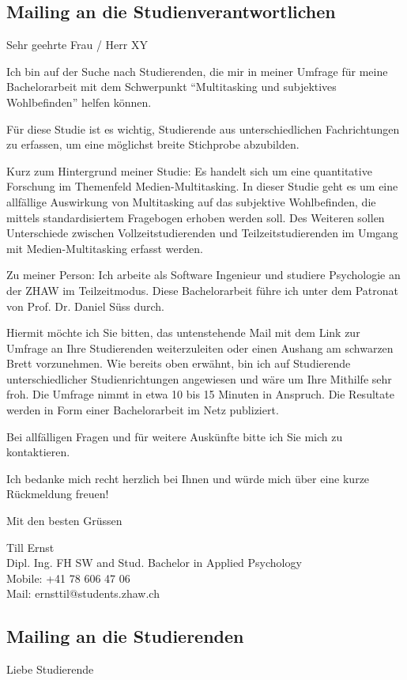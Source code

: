 \begin{RaggedRight}
\subsection{Mailing an die Studienverantwortlichen}\label{subsection.mailingVerantwortliche}
Sehr geehrte Frau / Herr XY

Ich bin auf der Suche nach Studierenden, die mir in meiner Umfrage für meine Bachelorarbeit mit dem Schwerpunkt “Multitasking und subjektives Wohlbefinden” helfen können.

Für diese Studie ist es wichtig, Studierende aus unterschiedlichen Fachrichtungen zu erfassen, um eine möglichst breite Stichprobe abzubilden.

Kurz zum Hintergrund meiner Studie: Es handelt sich um eine quantitative Forschung im Themenfeld Medien-Multitasking. In dieser Studie geht es um eine allfällige Auswirkung von Multitasking auf das subjektive Wohlbefinden, die mittels standardisiertem Fragebogen erhoben werden soll. Des Weiteren sollen Unterschiede zwischen Vollzeitstudierenden und Teilzeitstudierenden im Umgang mit Medien-Multitasking erfasst werden.

Zu meiner Person: Ich arbeite als Software Ingenieur und studiere Psychologie an der ZHAW im Teilzeitmodus. Diese Bachelorarbeit führe ich unter dem Patronat von Prof. Dr. Daniel Süss durch.

Hiermit möchte ich Sie bitten, das untenstehende Mail mit dem Link zur Umfrage an Ihre Studierenden weiterzuleiten oder einen Aushang am schwarzen Brett vorzunehmen. Wie bereits oben erwähnt, bin ich auf Studierende unterschiedlicher Studienrichtungen angewiesen und wäre um Ihre Mithilfe sehr froh. Die Umfrage nimmt in etwa 10 bis 15 Minuten in Anspruch. Die Resultate werden in Form einer Bachelorarbeit im Netz publiziert.

Bei allfälligen Fragen und für weitere Auskünfte bitte ich Sie mich zu kontaktieren.

Ich bedanke mich recht herzlich bei Ihnen und würde mich über eine kurze Rückmeldung freuen!

Mit den besten Grüssen

Till Ernst\\
Dipl. Ing. FH SW and Stud. Bachelor in Applied Psychology\\
Mobile: +41 78 606 47 06\\
Mail:  ernsttil@students.zhaw.ch 

\subsection{Mailing an die Studierenden}
Liebe Studierende


\end{RaggedRight}

